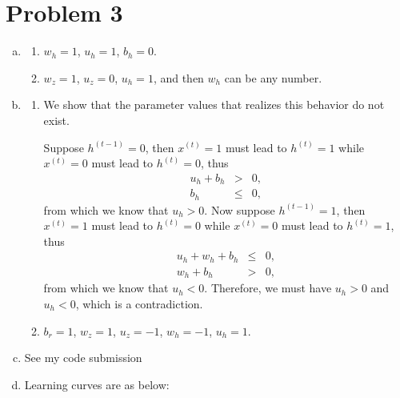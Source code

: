 \documentclass[11pt, oneside]{article}      %
\newcommand{\hasPageBreak}{\newpage}
\begin{document}
\section*{Problem 3}
\begin{enumerate}   [(a)]
\item 
\begin{enumerate}   [i]
\item $w_h = 1$, $u_h = 1$, $b_h = 0$.
\item $w_z = 1$, $u_z = 0$, $u_h = 1$, and then $w_h$ can be any number.
\end{enumerate}






\hasPageBreak
\item
\begin{enumerate}   [i]
\item 
We show that the parameter values that realizes this  behavior do not exist. 

Suppose $h^{(t-1)} = 0$, then $x^{(t)} = 1$ must lead to $h^{(t)} = 1$ while $x^{(t)} = 0$ must lead to $h^{(t)} = 0$, thus
\begin{eqnarray*}
u_h + b_h &>& 0,
\\
b_h &\leq& 0,
\end{eqnarray*}
from which we know that $u_h > 0$. Now suppose $h^{(t-1)} = 1$, then $x^{(t)} = 1$ must lead to $h^{(t)} = 0$ while $x^{(t)} = 0$ must lead to $h^{(t)} = 1$, thus
\begin{eqnarray*}
u_h + w_h + b_h &\leq& 0,
\\
w_h + b_h &>& 0,
\end{eqnarray*}
from which we know that $u_h < 0$. Therefore, we must have $u_h > 0$ and $u_h < 0$, which is a contradiction.



\item
$b_r = 1$, $w_z = 1$, $u_z = -1$, $w_h = -1$, $u_h = 1$.
\end{enumerate}


\item
See my code submission


\hasPageBreak
\item Learning curves are as below:


\end{enumerate}
\end{document}
